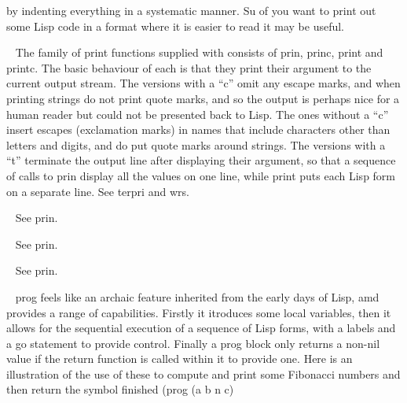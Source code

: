 \begin{description}
by indenting everything in a systematic manner. Su of you want to print out
some Lisp code in a format where it is easier to read it may be useful.
\item[{\tx prin~~~~~~~~~} \hspace{1cm} {\em function 1 arg}]~\newline
The family of print functions supplied with \vsl{} consists of
{\tx prin}, {\tx princ}, {\tx print} and {\tx printc}. The basic behaviour
of each is that they print their argument to the current output stream. The versions
with a ``{\tx c}'' omit any escape marks, and when printing strings do not
print quote marks, and so the output is perhaps nice for a human reader
but could not be presented back to Lisp. The ones without a ``{\tx c}''
insert escapes (exclamation marks) in names that include characters other
than letters and digits, and do put quote marks around strings. The versions
with a ``{\tx t}'' terminate the output line after displaying their
argument, so that a sequence of calls to {\tx prin} display all the
values on one line, while {\tx print} puts each Lisp form on a separate line.
See {\tx terpri} and {\tx wrs}.
\item[{\tx princ~~~~~~~~} \hspace{1cm} {\em function 1 arg}]~\newline
See {\tx prin}.
\item[{\tx print~~~~~~~~} \hspace{1cm} {\em function 1 arg}]~\newline
See {\tx prin}.
\item[{\tx printc~~~~~~~} \hspace{1cm} {\em function 1 arg}]~\newline
See {\tx prin}.
\item[{\tx prog~~~~~~~~~} \hspace{1cm} {\em special form}]~\newline
{\tx prog} feels like an archaic feature inherited from the early days of Lisp,
amd provides a range of capabilities. Firstly it itroduces some local
variables, then it allows for the sequential execution of a sequence of
Lisp forms, with a labels and a {\tx go} statement to provide control. Finally
a {\tx prog} block only returns a non-nil value if the {\tx return} function
is called within it to provide one. Here is an illustration of the
use of these to compute and print some Fibonacci numbers and then return the
symbol {\tx finished}
{\sverb
   (prog (a b n c)
}
\end{description}
